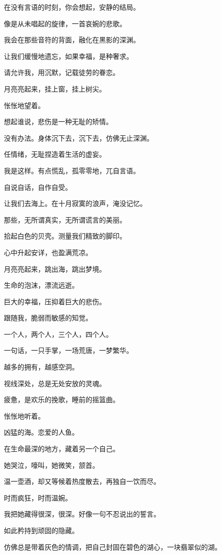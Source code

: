 \documentclass[12pt,a4paper]{article}
\begin{document}
		在没有言语的时刻，你会想起，安静的结局。

		像是从未唱起的旋律，一首哀婉的悲歌。

		我会在那些音符的背面，融化在黑影的深渊。

		让我们缓慢地遗忘，如果幸福，是种奢求。

		请允许我，用沉默，记载徒劳的眷恋。

	\endwriting



		月亮亮起来，挂上窗，挂上树尖。\par
		怅怅地望着。

		想起谁说，悲伤是一种无耻的矫情。\par
		没有办法。身体沉下去，沉下去，仿佛无止深渊。\par
		任情绪，无耻捏造着生活的虚妄。\par
		我是这样。有点慌乱，孤零零地，兀自言语。\par
		自说自话，自作自受。

		让我们去海上。在十月寂寞的浪声，淹没记忆。\par
		那些，无所谓真实，无所谓谎言的美丽。\par
		拾起白色的贝壳。测量我们精致的脚印。\par
		心中升起安详，也盈满荒凉。\par
		月亮亮起来，跳出海，跳出梦境。\par
		生命的泡沫，漂流远逝。\par
		巨大的幸福，压抑着巨大的悲伤。\par
		跟随我，脆弱而敏感的知觉。

		一个人，两个人，三个人，四个人。\par
		一句话，一只手掌，一场荒唐，一梦繁华。\par
		越多的拥有，越感空洞。\par
		视线深处，总是无处安放的灵魂。\par
		疲惫，是欢乐的挽歌，睡前的摇篮曲。

		怅怅地听着。\par
		凶猛的海。恋爱的人鱼。

	\endwriting



		在生命最深的地方，藏着另一个自己。\par
		她哭泣，嚎叫，她微笑，颔首。\par
		温一壶酒，却又等候着热度散去，再独自一饮而尽。\par
		时而疯狂，时而温婉。\par
		我把她藏得很深，很深。好像一句不忍说出的誓言。\par
		如此矜持到顽固的隐藏。\par
		仿佛总是带着灰色的情调，把自己封固在碧色的湖心，一块翡翠似的湖。
\end{document}
